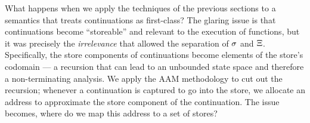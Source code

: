 What happens when we apply the techniques of the previous sections to a semantics that treats continuations as first-class?
%
The glaring issue is that continuations become ``storeable'' and relevant to the execution of functions, but it was precisely the \emph{irrelevance} that allowed the separation of $\sigma$ and $\Xi$.
%
Specifically, the store components of continuations become elements of the store's codomain --- a recursion that can lead to an unbounded state space and therefore a non-terminating analysis.
%
We apply the AAM methodology to cut out the recursion; whenever a continuation is captured to go into the store, we allocate an address to approximate the store component of the continuation.
%
The issue becomes, where do we map this address to a set of stores?
%
